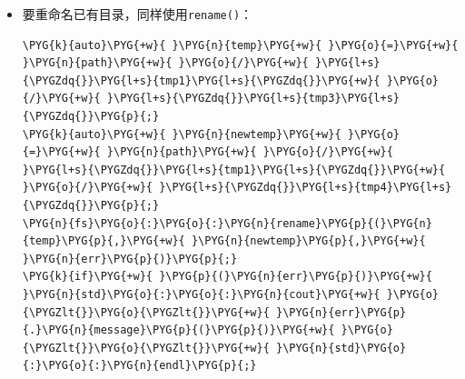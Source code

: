 \begin{itemize}
\begin{codeblockbg}
\begin{Verbatim}[commandchars=\\\{\},breaklines=true,breakanywhere=true,fontsize=\codefont,xleftmargin=17bp]
\PYG{k}{auto}\PYG{+w}{ }\PYG{n}{temp}\PYG{+w}{ }\PYG{o}{=}\PYG{+w}{ }\PYG{n}{path}\PYG{+w}{ }\PYG{o}{/}\PYG{+w}{ }\PYG{l+s}{\PYGZdq{}}\PYG{l+s}{tmp1}\PYG{l+s}{\PYGZdq{}}\PYG{+w}{ }\PYG{o}{/}\PYG{+w}{ }\PYG{l+s}{\PYGZdq{}}\PYG{l+s}{tmp2}\PYG{l+s}{\PYGZdq{}}\PYG{+w}{ }\PYG{o}{/}\PYG{+w}{ }\PYG{l+s}{\PYGZdq{}}\PYG{l+s}{tmp3}\PYG{l+s}{\PYGZdq{}}\PYG{p}{;}
\PYG{k}{auto}\PYG{+w}{ }\PYG{n}{newtemp}\PYG{+w}{ }\PYG{o}{=}\PYG{+w}{ }\PYG{n}{path}\PYG{+w}{ }\PYG{o}{/}\PYG{+w}{ }\PYG{l+s}{\PYGZdq{}}\PYG{l+s}{tmp1}\PYG{l+s}{\PYGZdq{}}\PYG{+w}{ }\PYG{o}{/}\PYG{+w}{ }\PYG{l+s}{\PYGZdq{}}\PYG{l+s}{tmp3}\PYG{l+s}{\PYGZdq{}}\PYG{p}{;}
\PYG{n}{fs}\PYG{o}{:}\PYG{o}{:}\PYG{n}{rename}\PYG{p}{(}\PYG{n}{temp}\PYG{p}{,}\PYG{+w}{ }\PYG{n}{newtemp}\PYG{p}{,}\PYG{+w}{ }\PYG{n}{err}\PYG{p}{)}\PYG{p}{;}
\PYG{k}{if}\PYG{+w}{ }\PYG{p}{(}\PYG{n}{err}\PYG{p}{)}\PYG{+w}{ }\PYG{n}{std}\PYG{o}{:}\PYG{o}{:}\PYG{n}{cout}\PYG{+w}{ }\PYG{o}{\PYGZlt{}}\PYG{o}{\PYGZlt{}}\PYG{+w}{ }\PYG{n}{err}\PYG{p}{.}\PYG{n}{message}\PYG{p}{(}\PYG{p}{)}\PYG{+w}{ }\PYG{o}{\PYGZlt{}}\PYG{o}{\PYGZlt{}}\PYG{+w}{ }\PYG{n}{std}\PYG{o}{:}\PYG{o}{:}\PYG{n}{endl}\PYG{p}{;}
\end{Verbatim}
\end{codeblockbg}



\item 要重命名已有目录，同样使用\texttt{rename()}：



\begin{codeblockbg}
\begin{Verbatim}[commandchars=\\\{\},breaklines=true,breakanywhere=true,fontsize=\codefont,xleftmargin=17bp]
\PYG{k}{auto}\PYG{+w}{ }\PYG{n}{temp}\PYG{+w}{ }\PYG{o}{=}\PYG{+w}{ }\PYG{n}{path}\PYG{+w}{ }\PYG{o}{/}\PYG{+w}{ }\PYG{l+s}{\PYGZdq{}}\PYG{l+s}{tmp1}\PYG{l+s}{\PYGZdq{}}\PYG{+w}{ }\PYG{o}{/}\PYG{+w}{ }\PYG{l+s}{\PYGZdq{}}\PYG{l+s}{tmp3}\PYG{l+s}{\PYGZdq{}}\PYG{p}{;}
\PYG{k}{auto}\PYG{+w}{ }\PYG{n}{newtemp}\PYG{+w}{ }\PYG{o}{=}\PYG{+w}{ }\PYG{n}{path}\PYG{+w}{ }\PYG{o}{/}\PYG{+w}{ }\PYG{l+s}{\PYGZdq{}}\PYG{l+s}{tmp1}\PYG{l+s}{\PYGZdq{}}\PYG{+w}{ }\PYG{o}{/}\PYG{+w}{ }\PYG{l+s}{\PYGZdq{}}\PYG{l+s}{tmp4}\PYG{l+s}{\PYGZdq{}}\PYG{p}{;}
\PYG{n}{fs}\PYG{o}{:}\PYG{o}{:}\PYG{n}{rename}\PYG{p}{(}\PYG{n}{temp}\PYG{p}{,}\PYG{+w}{ }\PYG{n}{newtemp}\PYG{p}{,}\PYG{+w}{ }\PYG{n}{err}\PYG{p}{)}\PYG{p}{;}
\PYG{k}{if}\PYG{+w}{ }\PYG{p}{(}\PYG{n}{err}\PYG{p}{)}\PYG{+w}{ }\PYG{n}{std}\PYG{o}{:}\PYG{o}{:}\PYG{n}{cout}\PYG{+w}{ }\PYG{o}{\PYGZlt{}}\PYG{o}{\PYGZlt{}}\PYG{+w}{ }\PYG{n}{err}\PYG{p}{.}\PYG{n}{message}\PYG{p}{(}\PYG{p}{)}\PYG{+w}{ }\PYG{o}{\PYGZlt{}}\PYG{o}{\PYGZlt{}}\PYG{+w}{ }\PYG{n}{std}\PYG{o}{:}\PYG{o}{:}\PYG{n}{endl}\PYG{p}{;}
\end{Verbatim}
\end{codeblockbg}



\end{itemize}
